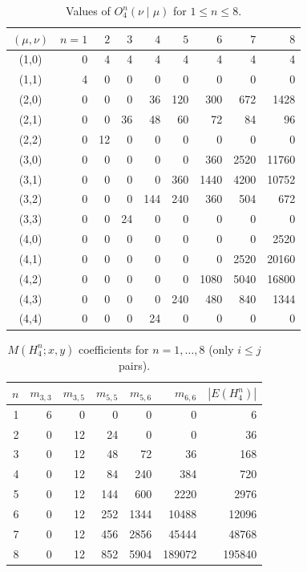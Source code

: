 \documentclass[letterpaper,12pt]{article}
\begin{document}
\begin{table}[H]
\centering

\renewcommand{\arraystretch}{1.2}
\begin{tabular}{c|rrrrrrrr}
$(\mu,\nu)$ & $n=1$ & $2$ & $3$ & $4$ & $5$ & $6$ & $7$ & $8$ \\ \hline
(1,0) & 0 & 4 & 4 & 4 & 4 & 4 & 4 & 4 \\
(1,1) & 4 & 0 & 0 & 0 & 0 & 0 & 0 & 0 \\
(2,0) & 0 & 0 & 0 & 36 & 120 & 300 & 672 & 1428 \\
(2,1) & 0 & 0 & 36 & 48 & 60 & 72 & 84 & 96 \\
(2,2) & 0 & 12 & 0 & 0 & 0 & 0 & 0 & 0 \\
(3,0) & 0 & 0 & 0 & 0 & 0 & 360 & 2520 & 11760 \\
(3,1) & 0 & 0 & 0 & 0 & 360 & 1440 & 4200 & 10752 \\
(3,2) & 0 & 0 & 0 & 144 & 240 & 360 & 504 & 672 \\
(3,3) & 0 & 0 & 24 & 0 & 0 & 0 & 0 & 0 \\
(4,0) & 0 & 0 & 0 & 0 & 0 & 0 & 0 & 2520 \\
(4,1) & 0 & 0 & 0 & 0 & 0 & 0 & 2520 & 20160 \\
(4,2) & 0 & 0 & 0 & 0 & 0 & 1080 & 5040 & 16800 \\
(4,3) & 0 & 0 & 0 & 0 & 240 & 480 & 840 & 1344 \\
(4,4) & 0 & 0 & 0 & 24 & 0 & 0 & 0 & 0 \\
\end{tabular}
\caption{Values of $O_{4}^{n}(\nu\mid\mu)$ for $1\le n\le 8$.}\label{tab:O4n-valus}
\end{table}


\begin{table}[H]
\centering

\begin{tabular}{r|rrrrrr}
\toprule
$n$ & $m_{3,3}$ & $m_{3,5}$ & $m_{5,5}$ & $m_{5,6}$ & $m_{6,6}$ & $|E(H_4^n)|$ \\
\midrule
1 & 6 & 0 & 0 & 0 & 0 & 6 \\
2 & 0 & 12 & 24 & 0 & 0 & 36 \\
3 & 0 & 12 & 48 & 72 & 36 & 168 \\
4 & 0 & 12 & 84 & 240 & 384 & 720 \\
5 & 0 & 12 & 144 & 600 & 2220 & 2976 \\
6 & 0 & 12 & 252 & 1344 & 10488 & 12096 \\
7 & 0 & 12 & 456 & 2856 & 45444 & 48768 \\
8 & 0 & 12 & 852 & 5904 & 189072 & 195840 \\
\bottomrule
\end{tabular}
\caption{$M(H_4^{n};x,y)$ coefficients for $n=1,\dots,8$ (only $i\le j$ pairs).}
\label{tab:MH4n-coeffs}
\end{table}
\end{document}
